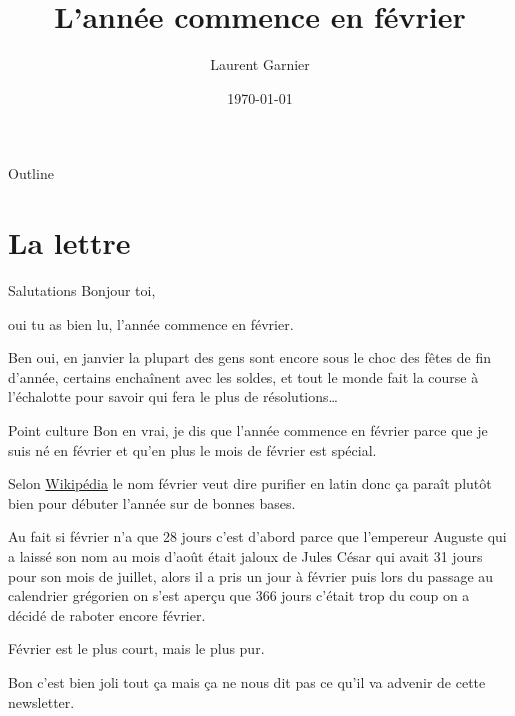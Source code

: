 \documentclass[presentation]{beamer}
\author{Laurent Garnier}
\date{\today}
\title{L'année commence en février}
\begin{document}
\maketitle
\begin{frame}{Outline}
\tableofcontents
\end{frame}


\section{La lettre}
\label{sec:org7be89b1}
\begin{frame}[label={sec:org60ab116}]{Salutations}
Bonjour toi,



oui tu as bien lu, l'année commence en février. 



Ben oui, en janvier la plupart des gens sont encore sous le choc des
fêtes de fin d'année, certains enchaînent avec les soldes, et tout le
monde fait la course à l'échalotte pour savoir qui fera le plus de
résolutions\ldots{}
\end{frame}



\begin{frame}[label={sec:orgb4936cf}]{Point culture}
Bon en vrai, je dis que l'année commence en février parce que je suis
né en février et qu'en plus le mois de février est spécial.




Selon \href{https://fr.wikipedia.org/wiki/F\%25C3\%25A9vrier}{Wikipédia} le nom février veut dire purifier en latin donc ça
paraît plutôt bien pour débuter l'année sur de bonnes bases. 




Au fait si février n'a que 28 jours c'est d'abord parce que l'empereur
Auguste qui a laissé son nom au mois d'août était jaloux de Jules
César qui avait 31 jours pour son mois de juillet, alors il a pris un
jour à février puis lors du passage au calendrier grégorien on s'est
aperçu que 366 jours c'était trop du coup on a décidé de raboter
encore février.




Février est le plus court, mais le plus pur.



Bon c'est bien joli tout ça mais ça ne nous dit pas ce qu'il va
advenir de cette newsletter.
\end{frame}
\end{document}
